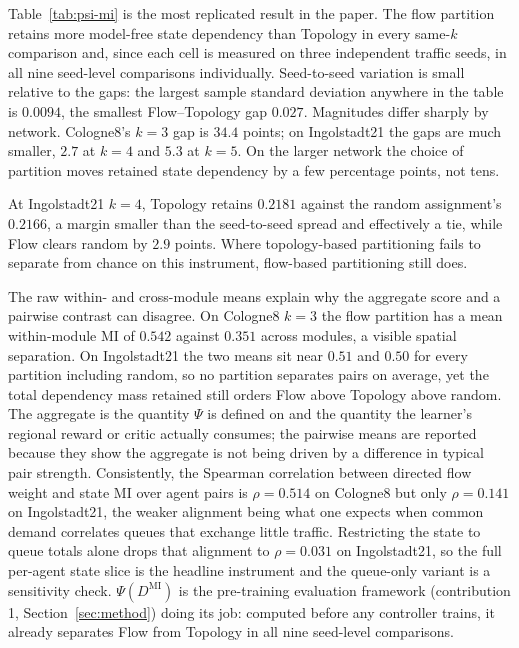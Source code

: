 \documentclass[journal]{IEEEtran}
\theoremstyle{definition}
\begin{document}
Table~\ref{tab:psi-mi} is the most replicated result in the paper.
The flow partition retains more model-free state dependency than Topology in
every same-$k$ comparison and, since each cell is measured on three
independent traffic seeds, in all nine seed-level comparisons individually.
Seed-to-seed variation is small relative to the gaps: the largest sample
standard deviation anywhere in the table is $0.0094$, the smallest
Flow--Topology gap $0.027$.
Magnitudes differ sharply by network.
Cologne8's $k=3$ gap is $34.4$ points; on Ingolstadt21 the gaps are much
smaller, $2.7$ at $k=4$ and $5.3$ at $k=5$.
On the larger network the choice of partition moves retained state dependency
by a few percentage points, not tens.

At Ingolstadt21 $k=4$, Topology retains $0.2181$ against the random assignment's
$0.2166$, a margin smaller than the seed-to-seed spread and effectively a
tie, while Flow clears random by $2.9$ points.
Where topology-based partitioning fails to separate from chance on this
instrument, flow-based partitioning still does.

The raw within- and cross-module means explain why the aggregate score and a
pairwise contrast can disagree.
On Cologne8 $k=3$ the flow partition has a mean within-module MI of $0.542$
against $0.351$ across modules, a visible spatial separation.
On Ingolstadt21 the two means sit near $0.51$ and $0.50$ for every partition
including random, so no partition separates pairs on average, yet the total
dependency mass retained still orders Flow above Topology above random.
The aggregate is the quantity $\Psi$ is defined on and the quantity the
learner's regional reward or critic actually consumes; the pairwise means are
reported because they show the aggregate is not being driven by a difference
in typical pair strength.
Consistently, the Spearman correlation between directed flow weight and state
MI over agent pairs is $\rho=0.514$ on Cologne8 but only $\rho=0.141$ on
Ingolstadt21, the weaker alignment being what one expects when common demand
correlates queues that exchange little traffic.
Restricting the state to queue totals alone drops that alignment to
$\rho=0.031$ on Ingolstadt21, so the full per-agent state slice is the
headline instrument and the queue-only variant is a sensitivity check.
$\Psi(D^{\mathrm{MI}})$ is the pre-training evaluation framework
(contribution 1, Section~\ref{sec:method}) doing its job: computed before any
controller trains, it already separates Flow from Topology in all nine
seed-level comparisons.
\end{document}
